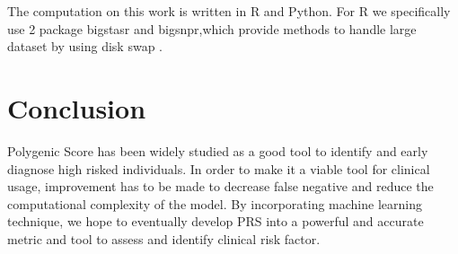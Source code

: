 \documentclass{article}
\begin{document}
The computation on this work is written in R and Python. For R we specifically use 2 
package bigstasr and bigsnpr,which provide methods to handle large dataset by using disk 
swap \cite{bigsnpr}.

\section{Conclusion}

Polygenic Score has been widely studied as a good tool to identify and early
diagnose high risked individuals. In order to make it a viable tool for clinical usage,
improvement has to be made to decrease false negative and reduce the computational
complexity of the model. By incorporating machine learning technique, we hope to
eventually develop PRS into a powerful and accurate metric and tool to assess
and identify clinical risk factor.



\end{document}
